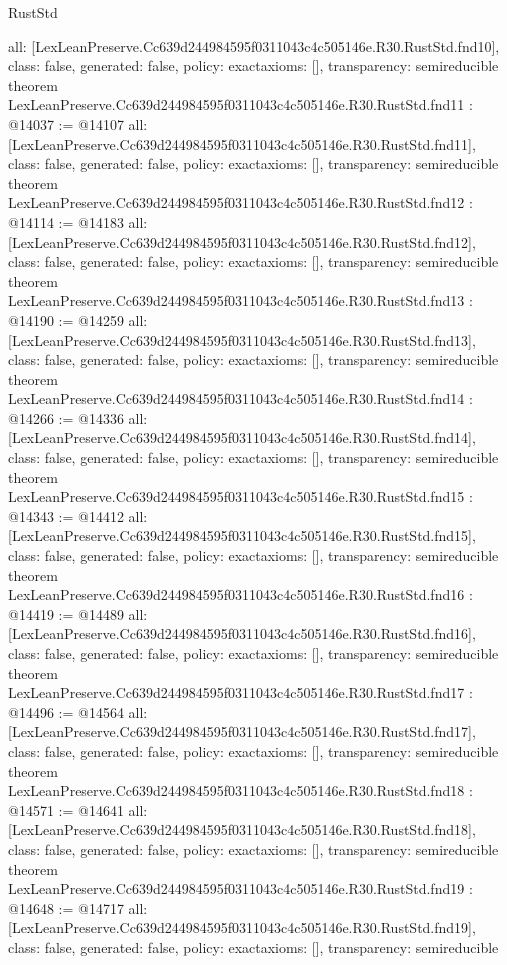 \begin{lexlean}{RustStd}
\begin{coremodule}
{  all: [LexLeanPreserve.Cc639d244984595f0311043c4c505146e.R30.RustStd.fnd10],
  class: false,
  generated: false,
  policy: exact{axioms: []},
  transparency: semireducible
}
theorem LexLeanPreserve.Cc639d244984595f0311043c4c505146e.R30.RustStd.fnd11 : @14037 := @14107 {
  all: [LexLeanPreserve.Cc639d244984595f0311043c4c505146e.R30.RustStd.fnd11],
  class: false,
  generated: false,
  policy: exact{axioms: []},
  transparency: semireducible
}
theorem LexLeanPreserve.Cc639d244984595f0311043c4c505146e.R30.RustStd.fnd12 : @14114 := @14183 {
  all: [LexLeanPreserve.Cc639d244984595f0311043c4c505146e.R30.RustStd.fnd12],
  class: false,
  generated: false,
  policy: exact{axioms: []},
  transparency: semireducible
}
theorem LexLeanPreserve.Cc639d244984595f0311043c4c505146e.R30.RustStd.fnd13 : @14190 := @14259 {
  all: [LexLeanPreserve.Cc639d244984595f0311043c4c505146e.R30.RustStd.fnd13],
  class: false,
  generated: false,
  policy: exact{axioms: []},
  transparency: semireducible
}
theorem LexLeanPreserve.Cc639d244984595f0311043c4c505146e.R30.RustStd.fnd14 : @14266 := @14336 {
  all: [LexLeanPreserve.Cc639d244984595f0311043c4c505146e.R30.RustStd.fnd14],
  class: false,
  generated: false,
  policy: exact{axioms: []},
  transparency: semireducible
}
theorem LexLeanPreserve.Cc639d244984595f0311043c4c505146e.R30.RustStd.fnd15 : @14343 := @14412 {
  all: [LexLeanPreserve.Cc639d244984595f0311043c4c505146e.R30.RustStd.fnd15],
  class: false,
  generated: false,
  policy: exact{axioms: []},
  transparency: semireducible
}
theorem LexLeanPreserve.Cc639d244984595f0311043c4c505146e.R30.RustStd.fnd16 : @14419 := @14489 {
  all: [LexLeanPreserve.Cc639d244984595f0311043c4c505146e.R30.RustStd.fnd16],
  class: false,
  generated: false,
  policy: exact{axioms: []},
  transparency: semireducible
}
theorem LexLeanPreserve.Cc639d244984595f0311043c4c505146e.R30.RustStd.fnd17 : @14496 := @14564 {
  all: [LexLeanPreserve.Cc639d244984595f0311043c4c505146e.R30.RustStd.fnd17],
  class: false,
  generated: false,
  policy: exact{axioms: []},
  transparency: semireducible
}
theorem LexLeanPreserve.Cc639d244984595f0311043c4c505146e.R30.RustStd.fnd18 : @14571 := @14641 {
  all: [LexLeanPreserve.Cc639d244984595f0311043c4c505146e.R30.RustStd.fnd18],
  class: false,
  generated: false,
  policy: exact{axioms: []},
  transparency: semireducible
}
theorem LexLeanPreserve.Cc639d244984595f0311043c4c505146e.R30.RustStd.fnd19 : @14648 := @14717 {
  all: [LexLeanPreserve.Cc639d244984595f0311043c4c505146e.R30.RustStd.fnd19],
  class: false,
  generated: false,
  policy: exact{axioms: []},
  transparency: semireducible
}
\end{coremodule}
\end{lexlean}
